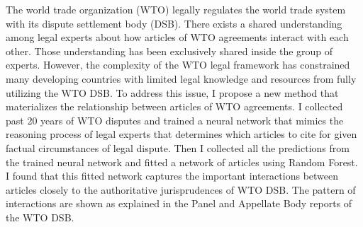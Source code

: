 The world trade organization (WTO) legally regulates the world trade system with its dispute settlement body (DSB).
There exists a shared understanding among legal experts about how articles of WTO agreements interact with each other. Those understanding has been exclusively shared inside the group of experts. 
However, the complexity of the WTO legal framework has constrained many developing countries with limited legal knowledge and resources from fully utilizing the WTO DSB.
To address this issue, I propose a new method that materializes the relationship between articles of WTO agreements.
I collected past 20 years of WTO disputes and trained a neural network that mimics the reasoning process of legal experts that determines which articles to cite for given factual circumstances of legal dispute.
Then I collected all the predictions from the trained neural network and fitted a network of articles using Random Forest.
I found that this fitted network captures the important interactions between articles closely to the authoritative jurisprudences of WTO DSB. 
The pattern of interactions are shown as explained in the Panel and Appellate Body reports of the WTO DSB. 

